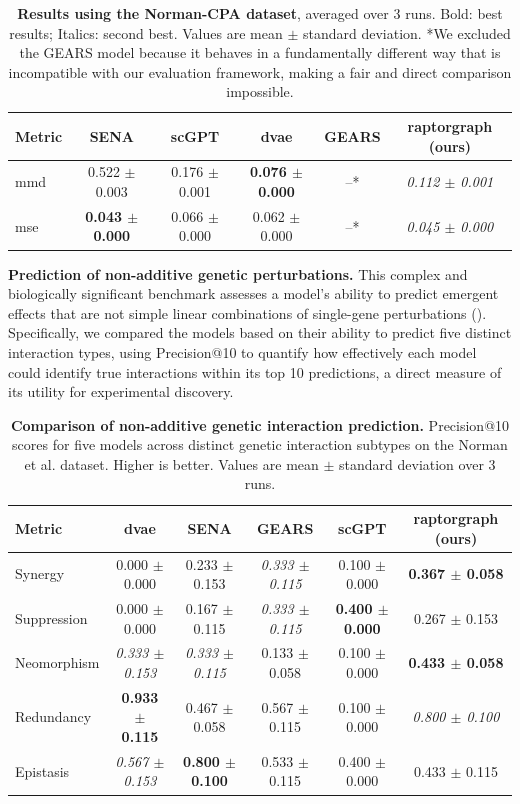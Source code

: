 \begin{table}[!ht]
\centering
\caption{\textbf{Results using the Norman-CPA dataset}, averaged over 3 runs. Bold: best results; Italics: second best. Values are mean $\pm$ standard deviation.
*We excluded the GEARS model because it behaves in a fundamentally different way that is incompatible with our evaluation framework, making a fair and direct comparison impossible.}
\begin{tabular}{lccccc}
\toprule
{Metric} & {SENA} & {scGPT} & {\gls{dvae}} & {GEARS} & {\gls{raptorgraph}} (ours) \\
\midrule
\gls{mmd} & 0.522 $\pm$ 0.003 & 0.176 $\pm$ 0.001 & \textbf{0.076 $\pm$ 0.000} & {--}* & \textit{0.112 $\pm$ 0.001} \\
\gls{mse} & \textbf{0.043 $\pm$ 0.000} & 0.066 $\pm$ 0.000 & 0.062 $\pm$ 0.000 & {--}* & \textit{0.045 $\pm$ 0.000} \\
\bottomrule
\end{tabular}
\label{tab:MMD_results}
\end{table}

\textbf{Prediction of non-additive genetic perturbations.} This complex and biologically significant benchmark assesses a model's ability to predict emergent effects that are not simple linear combinations of single-gene perturbations ().
Specifically, we compared the models based on their ability to predict five distinct interaction types, using Precision@10 to quantify how effectively each model could identify true interactions within its top 10 predictions, a direct measure of its utility for experimental discovery.

\begin{table}[!ht]
\centering
\caption{\textbf{Comparison of non-additive genetic interaction prediction.} Precision@10 scores for five models across distinct genetic interaction subtypes on the Norman et al. dataset. Higher is better. Values are mean $\pm$ standard deviation over 3 runs.}
\begin{tabular}{lccccc}
\toprule
Metric & \gls{dvae} & SENA & GEARS & scGPT & \gls{raptorgraph} (ours) \\
\midrule
Synergy & 0.000 $\pm$ 0.000 & 0.233 $\pm$ 0.153 & \textit{0.333 $\pm$ 0.115} & 0.100 $\pm$ 0.000 & \textbf{0.367 $\pm$ 0.058} \\
Suppression & 0.000 $\pm$ 0.000 & 0.167 $\pm$ 0.115 & \textit{0.333 $\pm$ 0.115} & \textbf{0.400 $\pm$ 0.000} & 0.267 $\pm$ 0.153 \\
Neomorphism & \textit{0.333 $\pm$ 0.153} & \textit{0.333 $\pm$ 0.115} & 0.133 $\pm$ 0.058 & 0.100 $\pm$ 0.000 & \textbf{0.433 $\pm$ 0.058} \\
Redundancy & \textbf{0.933 $\pm$ 0.115} & 0.467 $\pm$ 0.058 & 0.567 $\pm$ 0.115 & 0.100 $\pm$ 0.000 & \textit{0.800 $\pm$ 0.100} \\
Epistasis & \textit{0.567 $\pm$ 0.153} & \textbf{0.800 $\pm$ 0.100} & 0.533 $\pm$ 0.115 & 0.400 $\pm$ 0.000 & 0.433 $\pm$ 0.115 \\
\bottomrule
\end{tabular}
\label{tab:gi_scores}
\end{table}


